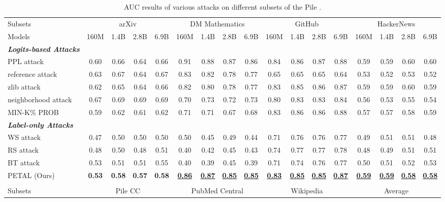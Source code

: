 \begin{table*}[!t]
\centering
\setlength{\tabcolsep}{2pt}
\caption{AUC results of various attacks on different subsets of the Pile \cite{gao2020pile}.}
\vspace{-2mm}
\scalebox{0.97}
{
\begin{tabular}{l|cccccccccccccccc}
\toprule
Subsets & \multicolumn{4}{c}{arXiv}&  \multicolumn{4}{c}{DM Mathematics}& \multicolumn{4}{c}{GitHub}& \multicolumn{4}{c}{HackerNews}\\
\cmidrule(l{5pt}r{5pt}){2-5}\cmidrule(l{5pt}r{5pt}){6-9}\cmidrule(l{5pt}r{5pt}){10-13}\cmidrule(l{5pt}r{5pt}){14-17}
Models & 160M& 1.4B& 2.8B& 6.9B& 160M& 1.4B& 2.8B& 6.9B& 160M& 1.4B& 2.8B& 6.9B& 160M& 1.4B& 2.8B& 6.9B\\
\midrule
\textbf{\textit{Logits-based Attacks}}&&&&&&&&&&&&\\
PPL attack&0.60&0.66&0.64&0.66&0.91&0.88&0.87&0.86&0.84&0.86&0.87&0.88&0.59&0.59&0.60&0.60\\
reference attack&0.63&0.67&0.64&0.67&0.83&0.82&0.78&0.77&0.65&0.65&0.65&0.64&0.53&0.52&0.53&0.52\\
zlib attack&0.62&0.65&0.64&0.66&0.82&0.80&0.78&0.77&0.83&0.85&0.86&0.87&0.59&0.59&0.60&0.59\\
neighborhood attack&0.67&0.69&0.69&0.69&0.70&0.73&0.72&0.73&0.80&0.83&0.83&0.84&0.56&0.53&0.55&0.54\\
MIN-K\% PROB&0.59&0.62&0.61&0.62&0.71&0.71&0.67&0.68&0.83&0.86&0.86&0.88&0.57&0.57&0.58&0.59\\
\textbf{\textit{Label-only Attacks}}&&&&&&&&&&&&\\
WS attack&0.47&0.50&0.50&0.50&0.50&0.45&0.49&0.44&0.71&0.76&0.76&0.77&0.49&0.51&0.51&0.48\\
RS attack&0.48&0.50&0.48&0.51&0.40&0.42&0.45&0.43&0.74&0.77&0.77&0.78&0.48&0.49&0.51&0.51\\
BT attack&0.53&0.51&0.51&0.55&0.40&0.39&0.45&0.39&0.71&0.74&0.76&0.77&0.50&0.51&0.52&0.53\\
PETAL (Ours)&\textbf{0.53}&\textbf{0.58}&\textbf{0.57}&\textbf{0.58}&\ul{\textbf{0.86}}&\ul{\textbf{0.87}}&\ul{\textbf{0.85}}&\ul{\textbf{0.85}}&\ul{\textbf{0.83}}&\ul{\textbf{0.85}}&\ul{\textbf{0.85}}&\ul{\textbf{0.87}}&\ul{\textbf{0.59}}&\ul{\textbf{0.59}}&\ul{\textbf{0.58}}&\ul{\textbf{0.58}}\\
\vspace{-.9em}\\
\toprule
Subsets & \multicolumn{4}{c}{Pile CC}&  \multicolumn{4}{c}{PubMed Central}& \multicolumn{4}{c}{Wikipedia}& \multicolumn{4}{c}{Average}\\

\end{tabular}}
\end{table*}
